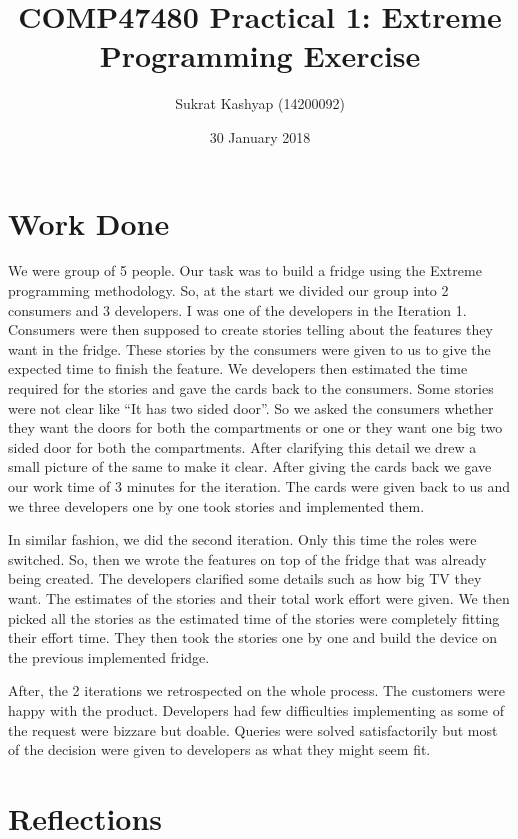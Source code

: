 \documentclass[12pt]{article}
\title{\vspace{-3.0cm}COMP47480 Practical 1: Extreme Programming Exercise}
\author{Sukrat Kashyap (14200092)}
\date{30 January 2018}
\begin{document}
\maketitle

\section{Work Done}

We were group of 5 people. Our task was to build a fridge using the Extreme programming methodology. So, at the start we divided our group into 2 consumers and 3 developers. I was one of the developers in the Iteration 1. Consumers were then supposed to create stories telling about the features they want in the fridge. These stories by the consumers were given to us to give the expected time to finish the feature. We developers then estimated the time required for the stories and gave the cards back to the consumers. Some stories were not clear like ``It has two sided door''. So we asked the consumers whether they want the doors for both the compartments or one or they want one big two sided door for both the compartments. After clarifying this detail we drew a small picture of the same to make it clear. After giving the cards back we gave our work time of 3 minutes for the iteration. The cards were given back to us and we three developers one by one took stories and implemented them.

In similar fashion, we did the second iteration. Only this time the roles were switched. So, then we wrote the features on top of the fridge that was already being created. The developers clarified some details such as how big TV they want. The estimates of the stories and their total work effort were given. We then picked all the stories as the estimated time of the stories were completely fitting their effort time. They then took the stories one by one and build the device on the previous implemented fridge.

After, the 2 iterations we retrospected on the whole process. The customers were happy with the product. Developers had few difficulties implementing as some of the request were bizzare but doable. Queries were solved satisfactorily but most of the decision were given to developers as what they might seem fit.

\section{Reflections}
\end{document}
